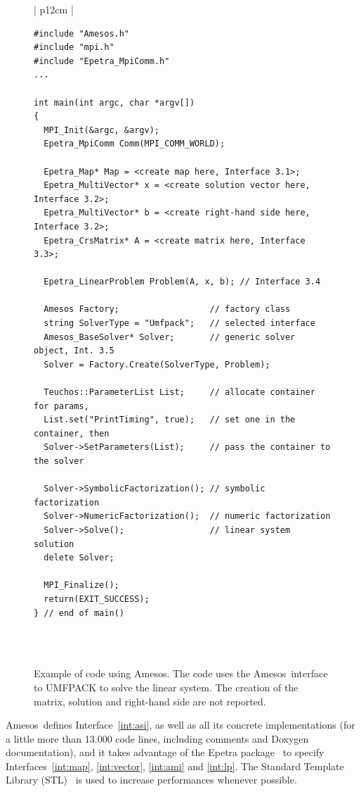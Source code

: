 \documentclass[acmtocl]{acmtrans2m}
\newcommand{\amesos}{{\sc Amesos}}
\begin{document}
\begin{figure}
\begin{center}
\begin{tabular}{| p{12cm} | }
\hline
 \\
\begin{minipage}{12cm}
\begin{verbatim}
#include "Amesos.h"
#include "mpi.h"
#include "Epetra_MpiComm.h"
...

int main(int argc, char *argv[]) 
{
  MPI_Init(&argc, &argv);
  Epetra_MpiComm Comm(MPI_COMM_WORLD);

  Epetra_Map* Map = <create map here, Interface 3.1>;
  Epetra_MultiVector* x = <create solution vector here, Interface 3.2>;
  Epetra_MultiVector* b = <create right-hand side here, Interface 3.2>; 
  Epetra_CrsMatrix* A = <create matrix here, Interface 3.3>;

  Epetra_LinearProblem Problem(A, x, b); // Interface 3.4

  Amesos Factory;                  // factory class
  string SolverType = "Umfpack";   // selected interface
  Amesos_BaseSolver* Solver;       // generic solver object, Int. 3.5
  Solver = Factory.Create(SolverType, Problem);

  Teuchos::ParameterList List;     // allocate container for params,
  List.set("PrintTiming", true);   // set one in the container, then
  Solver->SetParameters(List);     // pass the container to the solver

  Solver->SymbolicFactorization(); // symbolic factorization
  Solver->NumericFactorization();  // numeric factorization
  Solver->Solve();                 // linear system solution
  delete Solver;
    
  MPI_Finalize();
  return(EXIT_SUCCESS);
} // end of main()
\end{verbatim}
\end{minipage} \\
 \\
 \hline
\end{tabular}
\caption{Example of code using \amesos. The code uses the \amesos\ interface to
  UMFPACK to solve the linear system. The creation of the matrix, solution and
    right-hand side are not reported.}
\label{fig:example}
\end{center}
\end{figure}

\amesos\ defines Interface~\ref{int:asi}, as well as all its concrete
implementations (for a little more than 13.000 code lines, including comments
                 and Doxygen documentation), and it
takes advantage of the {\sc Epetra} package~\cite{Epetra-Ref-Guide} to specify
Interfaces~\ref{int:map}, \ref{int:vector}, \ref{int:ami} and \ref{int:lp}.
The Standard Template Library (STL)~\cite{wise96overview} is used
to increase performances whenever possible.
\end{document}
